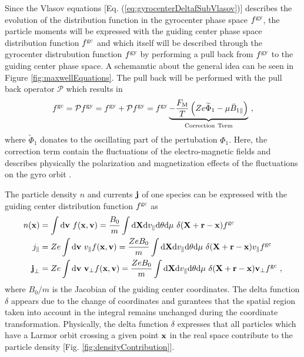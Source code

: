 Since the Vlasov equations [Eq. (\ref{eq:gyrocenterDeltafSubVlasov})] describes the evolution of the distribution function in the gyrocenter phase space $f^{\mathrm{gy}}$, the particle moments will be expressed with the guiding center phase space distribution function $f^{\mathrm{gc}}$ and which itself will be described through the gyrocenter distrubution function $f^{\mathrm{gy}}$ by performing a pull back from $f^{\mathrm{gy}}$ to the guiding center phase space. A schemamtic about the general idea can be seen in Figure \ref{fig:maxwellEquations}. The pull back will be performed with the pull back operator $\mathcal{P}$ which results in
\begin{gather}
	f^{\mathrm{gc}} = \mathcal{P} f^{\mathrm{gy}} = f^{\mathrm{gy}} + \mathcal{P}f^{\mathrm{gy}} = f^{\mathrm{gy}} \underbrace{- \frac{F_\mathrm{M}}{T}\left(Ze \widetilde{\Phi}_1 - \mu \bar{B}_{1\parallel}\right)}_{\mathrm{Correction~Term}}~,
	\label{eq:pullback}
\end{gather}
where $\widetilde{\Phi}_1$ donates to the oscillating part of the pertubation $\Phi_1$. Here, the correction term contain the fluctuations of the electro-magnetic fields and describes physically the polarization and magnetization effects of the fluctuations on the gyro orbit \source.
 

The particle density $n$ and currents $\boldsymbol{\mathbf{j}}$ of one species can be expressed with the guiding center distribution function $f^{\mathrm{gc}}$ as
\begin{gather}
	\begin{aligned}
		n(\boldsymbol{\mathbf{x}}) &= \int \mathrm{d}\boldsymbol{\mathbf{v}} ~ f(\boldsymbol{\mathbf{x}}, \boldsymbol{\mathbf{v}}) = \frac{B_0}{m} \int \mathrm{d}\boldsymbol{\mathbf{X}}\mathrm{d}v_\parallel\mathrm{d}\theta\mathrm{d}\mu ~ \delta(\boldsymbol{\mathbf{X}} + \boldsymbol{\mathbf{r}} - \boldsymbol{\mathbf{x}}) f^{\mathrm{gc}} \\
		j_\parallel &= Ze \int \mathrm{d}\boldsymbol{\mathbf{v}} ~ v_\parallel f(\boldsymbol{\mathbf{x}}, \boldsymbol{\mathbf{v}})= \frac{Ze B_0}{m} \int \mathrm{d}\boldsymbol{\mathbf{X}}\mathrm{d}v_\parallel\mathrm{d}\theta\mathrm{d}\mu ~ \delta(\boldsymbol{\mathbf{X}} + \boldsymbol{\mathbf{r}} - \boldsymbol{\mathbf{x}}) v_\parallel f^{\mathrm{gc}} \\
		\boldsymbol{\mathbf{j}}_\perp &= Ze \int \mathrm{d}\boldsymbol{\mathbf{v}} ~ \boldsymbol{\mathbf{v}}_\perp f(\boldsymbol{\mathbf{x}}, \boldsymbol{\mathbf{v}}) = \frac{Ze B_0}{m} \int \mathrm{d}\boldsymbol{\mathbf{X}}\mathrm{d}v_\parallel\mathrm{d}\theta\mathrm{d}\mu ~ \delta(\boldsymbol{\mathbf{X}} + \boldsymbol{\mathbf{r}} - \boldsymbol{\mathbf{x}}) \boldsymbol{\mathbf{v}}_\perp f^{\mathrm{gc}} ~,
	\end{aligned}
	\label{eq:momentsGuidingCenter}
\end{gather}
where $B_0/m$ is the Jacobian of the guiding center coordinates. The delta function $\delta$ appears due to the change of coordinates and gurantees that the spatial region taken into account in the integral remains unchanged during the coordinate transformation. Physically, the delta function $\delta$ expresses that all particles which have a Larmor orbit crossing a given point $\boldsymbol{\mathbf{x}}$ in the real space contribute to the particle density [Fig. \ref{fig:densityContribution}]. 

